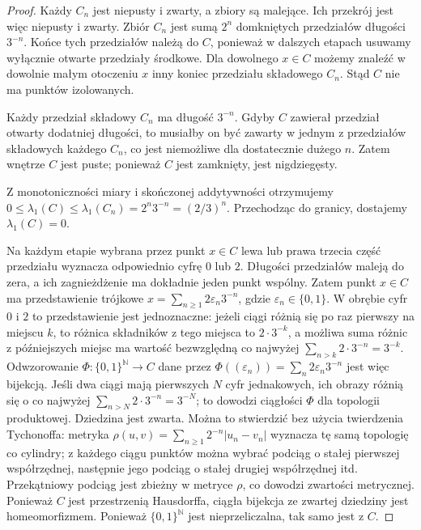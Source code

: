 \documentclass[11pt,a4paper,oneside]{book}
\numberwithin{equation}{chapter}
\theoremstyle{plain}
\theoremstyle{definition}
\theoremstyle{remark}
\begin{document}
\begin{proof}
Każdy $C_n$ jest niepusty i zwarty, a zbiory są
malejące. Ich przekrój jest więc niepusty i zwarty.
Zbiór $C_n$ jest sumą $2^n$ domkniętych przedziałów
długości $3^{-n}$. Końce tych przedziałów należą do
$C$, ponieważ w dalszych etapach usuwamy wyłącznie
otwarte przedziały środkowe. Dla dowolnego $x\in C$
możemy znaleźć w dowolnie małym otoczeniu $x$
inny koniec przedziału składowego $C_n$.
Stąd $C$ nie ma punktów izolowanych.

Każdy przedział składowy $C_n$ ma długość $3^{-n}$.
Gdyby $C$ zawierał przedział otwarty dodatniej długości,
to musiałby on być zawarty w jednym z przedziałów
składowych każdego $C_n$, co jest niemożliwe dla
dostatecznie dużego $n$. Zatem wnętrze $C$ jest puste;
ponieważ $C$ jest zamknięty, jest nigdziegęsty.

Z monotoniczności miary i skończonej addytywności
otrzymujemy
$0\le\lambda_1(C)\le\lambda_1(C_n)=2^n3^{-n}=(2/3)^n$.
Przechodząc do granicy, dostajemy $\lambda_1(C)=0$.

Na każdym etapie wybrana przez punkt $x\in C$ lewa lub prawa
trzecia część przedziału wyznacza odpowiednio cyfrę $0$ lub $2$.
Długości przedziałów maleją do zera, a ich zagnieżdżenie
ma dokładnie jeden punkt wspólny. Zatem punkt $x\in C$
ma przedstawienie trójkowe
$x=\sum_{n\ge1}2\varepsilon_n3^{-n}$, gdzie
$\varepsilon_n\in\{0,1\}$. W obrębie cyfr $0$ i $2$
to przedstawienie jest jednoznaczne: jeżeli ciągi
różnią się po raz pierwszy na miejscu $k$, to różnica
składników z tego miejsca to $2\cdot3^{-k}$,
a możliwa suma różnic z późniejszych miejsc ma wartość
bezwzględną co najwyżej
$\sum_{n>k}2\cdot3^{-n}=3^{-k}$.
Odwzorowanie
$\Phi:\{0,1\}^{\mathbb N}\to C$ dane przez
$\Phi((\varepsilon_n))=\sum_n2\varepsilon_n3^{-n}$
jest więc bijekcją. Jeśli dwa ciągi mają pierwszych
$N$ cyfr jednakowych, ich obrazy różnią się o co
najwyżej $\sum_{n>N}2\cdot3^{-n}=3^{-N}$;
to dowodzi ciągłości $\Phi$ dla topologii produktowej.
Dziedzina jest zwarta. Można to stwierdzić bez użycia
twierdzenia Tychonoffa: metryka
$\rho(u,v)=\sum_{n\ge1}2^{-n}|u_n-v_n|$
wyznacza tę samą topologię co cylindry; z każdego ciągu
punktów można wybrać podciąg o stałej pierwszej
współrzędnej, następnie jego podciąg o stałej drugiej
współrzędnej itd. Przekątniowy podciąg jest zbieżny
w metryce $\rho$, co dowodzi zwartości metrycznej.
Ponieważ $C$ jest przestrzenią Hausdorffa,
ciągła bijekcja ze zwartej dziedziny jest homeomorfizmem.
Ponieważ $\{0,1\}^{\mathbb N}$ jest nieprzeliczalna,
tak samo jest z $C$.
\end{proof}
\end{document}
